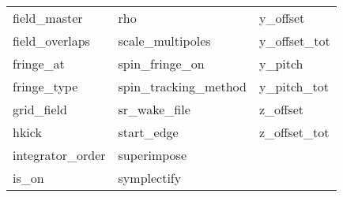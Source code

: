 \begin{tabular}{lll}
field_master                & rho                         & y_offset                    \\
field_overlaps              & scale_multipoles            & y_offset_tot                \\
fringe_at                   & spin_fringe_on              & y_pitch                     \\
fringe_type                 & spin_tracking_method        & y_pitch_tot                 \\
grid_field                  & sr_wake_file                & z_offset                    \\
hkick                       & start_edge                  & z_offset_tot                \\
integrator_order            & superimpose                 &                             \\
is_on                       & symplectify                 &                             \\
 \bottomrule
 \end{tabular}
 \vfill
 
